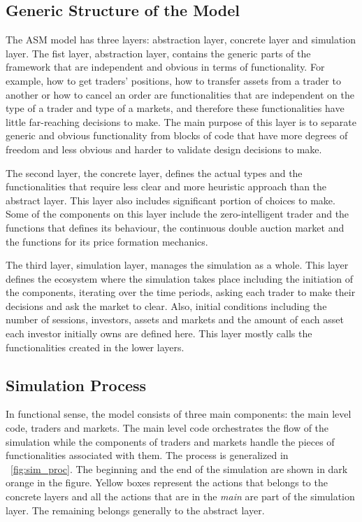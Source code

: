 \subsection{Generic Structure of the Model}
The ASM model has three layers: abstraction layer, concrete %
layer and simulation layer. The fist layer, abstraction layer, contains the 
generic parts of the framework that are independent and obvious in terms
of functionality. For example, how to get traders' positions, how to
transfer assets from a trader to another or how to cancel an order are
functionalities that are independent on the type of a trader 
and type of a markets, and therefore these functionalities have little
far-reaching decisions to make. The main purpose of this layer
is to separate generic and obvious functionality from blocks of code
that have more degrees of freedom and less obvious and harder to validate 
design decisions to make.

The second layer, the concrete layer, defines the actual types and the
functionalities that require less clear and more heuristic
approach than the abstract layer. This layer also includes significant
portion of choices to make. Some of the components
on this layer include the zero-intelligent trader and the
functions that defines its behaviour, the continuous double auction
market and the functions for its price formation mechanics.

The third layer, simulation layer, manages the simulation as a whole.
This layer defines the ecosystem where the simulation takes place including
the initiation of the components, iterating over the time periods, asking
each trader to make their decisions and ask the market to clear. 
Also, initial conditions including the number of sessions, investors, assets and markets
and the amount of each asset each investor initially owns are defined here. 
This layer mostly calls the functionalities created in the lower layers.



\subsection{Simulation Process}
In functional sense, the model consists of three main components:
the main level code, traders and markets. The main level code 
orchestrates the flow of the simulation while the components of traders 
and markets handle the pieces of functionalities associated with them. The process
is generalized in ~\ref{fig:sim_proc}. The beginning and the end of the 
simulation are shown in dark orange in the figure. Yellow boxes represent
the actions that belongs to the concrete layers and all the actions that
are in the \textit{main} are part of the simulation layer. The remaining belongs
generally to the abstract layer.


